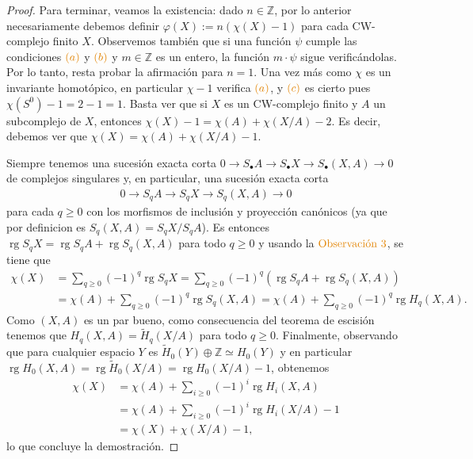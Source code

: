 \documentclass[11pt]{article}
\newcommand{\Z}{\mathbb{Z}}
\newcommand{\rg}{\operatorname{rg}}
\newcommand{\paint}[1]{\color{color}{#1}}
\begin{document}
\begin{proof}
Para terminar, veamos la existencia: dado $n \in \Z$, por lo anterior necesariamente debemos definir $\varphi(X) := n(\chi(X)-1)$ para cada CW-complejo finito $X$. Observemos tambi\'en que si una funci\'on $\psi$ cumple las condiciones $\paint{(a)}$ y $\paint{(b)}$ y $m \in \Z$ es un entero, la funci\'on $m \cdot \psi$ sigue verific\'andolas. Por lo tanto, resta probar la afirmaci\'on para $n = 1$. Una vez m\'as como $\chi$ es un invariante homot\'opico, en particular $\chi -1$ verifica $\paint{(a)}$, y $\paint{(c)}$ es cierto pues $\chi(S^0)-1 = 2-1 = 1$. Basta ver que si $X$ es un CW-complejo finito y $A$ un subcomplejo de $X$, entonces $\chi(X) -1 = \chi(A) + \chi(X/A) -2$. Es decir, debemos ver que $\chi(X) = \chi(A) + \chi(X/A) -1$. 

Siempre tenemos una sucesi\'on exacta corta $0 \to S_\bullet A \to S_\bullet X \to S_\bullet(X,A) \to 0$ de complejos singulares y, en particular, una sucesi\'on exacta corta
\begin{align*}
0 \to S_q A \to S_q X \to S_q(X,A) \to 0
\end{align*}
para cada $q \geq 0$ con los morfismos de inclusi\'on y proyecci\'on can\'onicos (ya que por definicion es $S_q(X,A) = S_qX/S_qA$). Es entonces $\rg S_qX = \rg S_qA + \rg S_q(X,A)$ para todo $q \geq 0$ y usando la $\paint{\text{Observaci\'on $3$}}$, se tiene que
\begin{align*}
\chi(X) &= \sum_{q \geq 0}(-1)^q \rg S_qX = \sum_{q \geq 0}(-1)^q(\rg S_qA + \rg S_q(X,A))\\
&= \chi(A) + \sum_{q \geq 0}(-1)^q\rg S_q(X,A) = \chi(A) + \sum_{q \geq 0}(-1)^q\rg H_q(X,A).
\end{align*}
Como $(X,A)$ es un par bueno, como consecuencia del teorema de escisi\'on tenemos que $H_q(X,A) = \tilde{H}_q(X/A)$ para todo $q \geq 0$. Finalmente, observando que para cualquier espacio $Y$ es $\tilde{H}_0(Y) \oplus \Z \simeq H_0(Y)$ y en particular $\rg H_0(X,A) = \rg \tilde{H}_0(X/A) = \rg H_0(X/A) -1$, obtenemos
\begin{align*}
\chi(X) &= \chi(A) + \sum_{i \geq 0}(-1)^i\rg H_i(X,A)\\
&= \chi(A) + \sum_{i \geq 0}(-1)^i\rg H_i(X/A) - 1\\
&= \chi(X) + \chi(X/A) -1,
\end{align*}
lo que concluye la demostraci\'on.
\end{proof}
\end{document}
